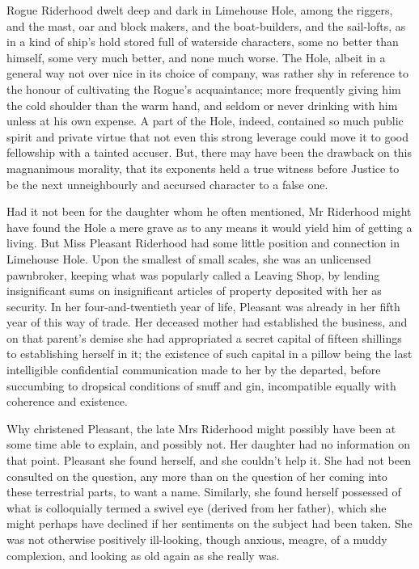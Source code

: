 Rogue Riderhood dwelt deep and dark in Limehouse Hole, among the
riggers, and the mast, oar and block makers, and the boat-builders, and
the sail-lofts, as in a kind of ship’s hold stored full of waterside
characters, some no better than himself, some very much better, and
none much worse. The Hole, albeit in a general way not over nice in
its choice of company, was rather shy in reference to the honour of
cultivating the Rogue’s acquaintance; more frequently giving him the
cold shoulder than the warm hand, and seldom or never drinking with him
unless at his own expense. A part of the Hole, indeed, contained so
much public spirit and private virtue that not even this strong leverage
could move it to good fellowship with a tainted accuser. But, there may
have been the drawback on this magnanimous morality, that its exponents
held a true witness before Justice to be the next unneighbourly and
accursed character to a false one.

Had it not been for the daughter whom he often mentioned, Mr Riderhood
might have found the Hole a mere grave as to any means it would yield
him of getting a living. But Miss Pleasant Riderhood had some little
position and connection in Limehouse Hole. Upon the smallest of small
scales, she was an unlicensed pawnbroker, keeping what was popularly
called a Leaving Shop, by lending insignificant sums on insignificant
articles of property deposited with her as security. In her
four-and-twentieth year of life, Pleasant was already in her fifth year
of this way of trade. Her deceased mother had established the business,
and on that parent’s demise she had appropriated a secret capital of
fifteen shillings to establishing herself in it; the existence of
such capital in a pillow being the last intelligible confidential
communication made to her by the departed, before succumbing to
dropsical conditions of snuff and gin, incompatible equally with
coherence and existence.

Why christened Pleasant, the late Mrs Riderhood might possibly have
been at some time able to explain, and possibly not. Her daughter had no
information on that point. Pleasant she found herself, and she couldn’t
help it. She had not been consulted on the question, any more than on
the question of her coming into these terrestrial parts, to want a name.
Similarly, she found herself possessed of what is colloquially termed
a swivel eye (derived from her father), which she might perhaps have
declined if her sentiments on the subject had been taken. She was not
otherwise positively ill-looking, though anxious, meagre, of a muddy
complexion, and looking as old again as she really was.

